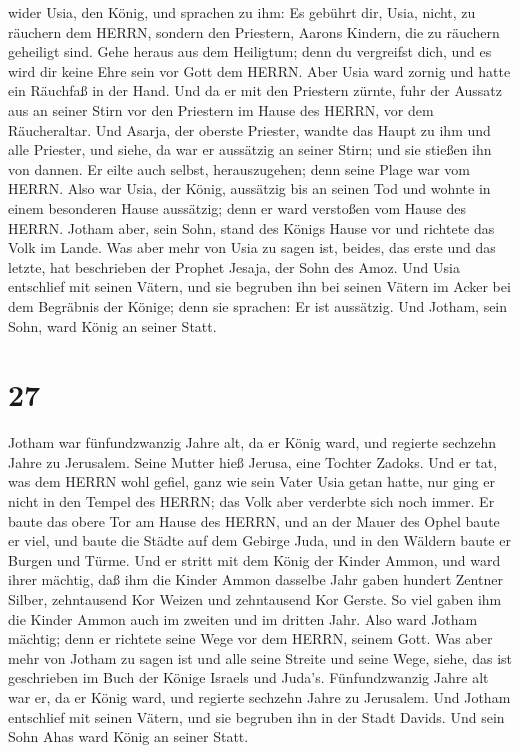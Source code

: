 wider Usia, den König, und sprachen zu ihm: Es gebührt dir, Usia, nicht,
zu räuchern dem HERRN, sondern den Priestern, Aarons Kindern, die zu
räuchern geheiligt sind. Gehe heraus aus dem Heiligtum; denn du
vergreifst dich, und es wird dir keine Ehre sein vor Gott dem HERRN.
 Aber Usia ward zornig und hatte ein Räuchfaß in der Hand.
Und da er mit den Priestern zürnte, fuhr der Aussatz aus an seiner Stirn
vor den Priestern im Hause des HERRN, vor dem Räucheraltar.
 Und Asarja, der oberste Priester, wandte das Haupt zu ihm
und alle Priester, und siehe, da war er aussätzig an seiner Stirn; und
sie stießen ihn von dannen. Er eilte auch selbst, herauszugehen; denn
seine Plage war vom HERRN.  Also war Usia, der König,
aussätzig bis an seinen Tod und wohnte in einem besonderen Hause
aussätzig; denn er ward verstoßen vom Hause des HERRN. Jotham aber, sein
Sohn, stand des Königs Hause vor und richtete das Volk im Lande.
 Was aber mehr von Usia zu sagen ist, beides, das erste und
das letzte, hat beschrieben der Prophet Jesaja, der Sohn des Amoz.
 Und Usia entschlief mit seinen Vätern, und sie begruben
ihn bei seinen Vätern im Acker bei dem Begräbnis der Könige; denn sie
sprachen: Er ist aussätzig. Und Jotham, sein Sohn, ward König an seiner
Statt.

\hypertarget{section-26}{%
\section{27}\label{section-26}}

 Jotham war fünfundzwanzig Jahre alt, da er König ward, und
regierte sechzehn Jahre zu Jerusalem. Seine Mutter hieß Jerusa, eine
Tochter Zadoks.  Und er tat, was dem HERRN wohl gefiel, ganz
wie sein Vater Usia getan hatte, nur ging er nicht in den Tempel des
HERRN; das Volk aber verderbte sich noch immer.  Er baute
das obere Tor am Hause des HERRN, und an der Mauer des Ophel baute er
viel,  und baute die Städte auf dem Gebirge Juda, und in den
Wäldern baute er Burgen und Türme.  Und er stritt mit dem
König der Kinder Ammon, und ward ihrer mächtig, daß ihm die Kinder Ammon
dasselbe Jahr gaben hundert Zentner Silber, zehntausend Kor Weizen und
zehntausend Kor Gerste. So viel gaben ihm die Kinder Ammon auch im
zweiten und im dritten Jahr.  Also ward Jotham mächtig; denn
er richtete seine Wege vor dem HERRN, seinem Gott.  Was aber
mehr von Jotham zu sagen ist und alle seine Streite und seine Wege,
siehe, das ist geschrieben im Buch der Könige Israels und Juda's.
 Fünfundzwanzig Jahre alt war er, da er König ward, und
regierte sechzehn Jahre zu Jerusalem.  Und Jotham entschlief
mit seinen Vätern, und sie begruben ihn in der Stadt Davids. Und sein
Sohn Ahas ward König an seiner Statt.

